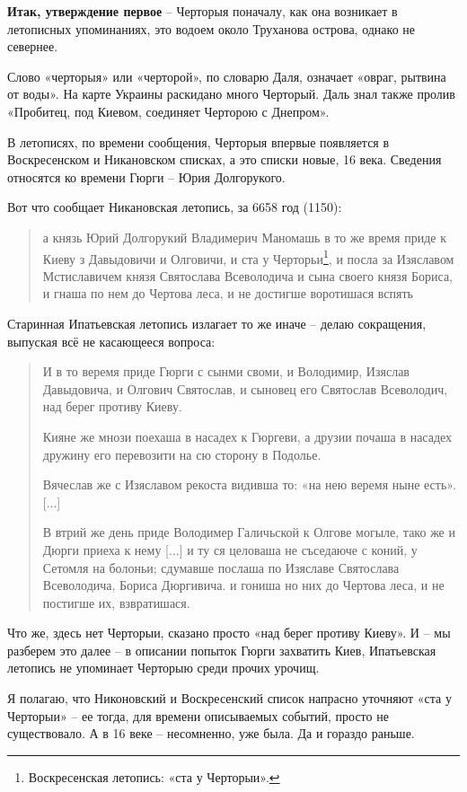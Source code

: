 \textbf{Итак, утверждение первое} – Черторыя поначалу, как она возникает в летописных упоминаниях, это водоем около Труханова острова, однако не севернее.

Слово «черторыя» или «черторой», по словарю Даля, означает «овраг, рытвина от воды». На карте Украины раскидано много Черторый. Даль знал также пролив «Пробитец, под Киевом, соединяет Черторою с Днепром».

В летописях, по времени сообщения, Черторыя впервые появляется в Воскресенском и Никановском списках, а это списки новые, 16 века. Сведения относятся ко времени Гюрги – Юрия Долгорукого.

Вот что сообщает Никановская летопись, за 6658 год (1150):

\begin{quotation}
а князь Юрий Долгорукий Владимерич Маномашь в то же время приде к Киеву з Давыдовичи и Олговичи, и ста у Черторьи\footnote{Воскресенская летопись: «ста у Черторыи».}, и посла за Изяславом Мстиславичем князя Святослава Всеволодича и сына своего князя Бориса, и гнаша по нем до Чертова леса, и не достигше воротишася вспять 
\end{quotation}

Старинная Ипатьевская летопись излагает то же иначе – делаю сокращения, выпуская всё не касающееся вопроса:

\begin{quotation}
И в то веремя приде Гюрги с сынми своми, и Володимир, Изяслав Давыдовича, и Олгович Святослав, и сыновец его Святослав Всеволодич, над берег противу Киеву.

Кияне же мнози поехаша в насадех к Гюргеви, а друзии почаша в насадех дружину его перевозити на сю сторону в Подолье.

Вячеслав же с Изяславом рекоста видивша то: «на нею веремя ныне есть». [...]

В втрий же день приде Володимер Галичьской к Олгове могыле, тако же и Дюрги приеха к нему [...] и ту ся целоваша не съседаюче с коний, у Сетомля на болоньи; сдумавше послаша по Изяславе Святослава Всеволодича, Бориса Дюргивича. и гониша но них до Чертова леса, и не постигше их, взвратишася.
\end{quotation}

Что же, здесь нет Черторыи, сказано просто «над берег противу Киеву». И – мы разберем это далее – в описании попыток Гюрги захватить Киев, Ипатьевская летопись не упоминает Черторыю среди прочих урочищ.

Я полагаю, что Никоновский и Воскресенский список напрасно уточняют «ста у Черторыи» – ее тогда, для времени описываемых событий, просто не существовало. А в 16 веке – несомненно, уже была. Да и гораздо раньше.

